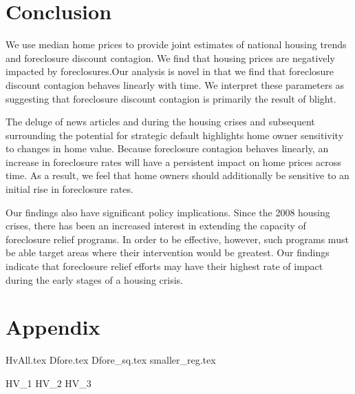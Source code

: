 \documentclass[12pt,oneside]{amsbook}
\begin{document}
\section{Conclusion}
We use median home prices to provide joint estimates of national housing trends and foreclosure discount contagion. We find that housing prices are negatively impacted by foreclosures.Our analysis is novel in that we find that foreclosure discount contagion behaves linearly with time. We interpret these parameters as suggesting that foreclosure discount contagion is primarily the result of blight.

 The deluge of news articles and during the housing crises and subsequent surrounding the potential for strategic default highlights home owner sensitivity to changes in home value. Because foreclosure contagion behaves linearly, an increase in foreclosure rates will have a persistent impact on home prices across time. As a result, we feel that home owners should additionally be sensitive to an initial rise in foreclosure rates. 
 
 Our findings also have significant policy implications. Since the 2008 housing crises, there has been an increased interest in extending the capacity of foreclosure relief programs. In order to be effective, however, such programs must be able target areas where their intervention would be greatest. Our findings indicate that foreclosure relief efforts may have their highest rate of impact during the early stages of a housing crisis.
\newpage
\printbibliography


\newpage

\appendix
\section{Appendix} \label{app:B}
{HvAll.tex}
{Dfore.tex}
{Dfore_sq.tex}
{smaller_reg.tex}\label{tab:baseline}



{HV_1}
{HV_2}
{HV_3}
\end{document}
